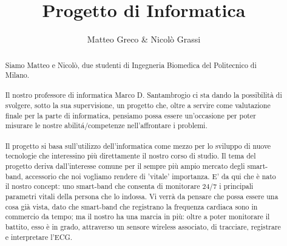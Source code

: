 \documentclass[a4paper, 12pt]{article}
\author{Matteo Greco \& Nicol\`o Grassi}
\title{Progetto di Informatica}
\date{}
\begin{document}
\maketitle
\begin{abstract}
Siamo Matteo e Nicol\`o, due studenti di Ingegneria Biomedica del Politecnico di Milano.\\\\Il nostro professore di informatica Marco D. Santambrogio ci sta dando la possibilit\`a di svolgere, sotto la sua supervisione, un progetto che, oltre a servire come valutazione finale per la parte di informatica, pensiamo possa essere un'occasione per poter misurare le nostre abilit\'a/competenze nell'affrontare i problemi.\\\\
Il progetto si basa sull'utilizzo dell'informatica come mezzo per lo sviluppo di nuove tecnologie che interessino pi\`u direttamente il nostro corso di studio.
Il tema del progetto deriva dall'interesse comune per il sempre pi\`u ampio mercato degli smart-band, accessorio che noi vogliamo rendere di 'vitale' importanza. E' da qui che \`e nato il nostro concept: uno smart-band che consenta di monitorare 24/7 i principali parametri vitali della persona che lo indossa. Vi verr\`a da pensare che possa essere una cosa gi\`a vista, dato che smart-band che registrano la frequenza cardiaca sono in commercio da tempo; ma il nostro ha una marcia in pi\`u: oltre a poter monitorare il battito, esso \`e in grado, attraverso un sensore wireless associato, di tracciare, registrare e interpretare l'ECG. 
\end{abstract}
\end{document}
